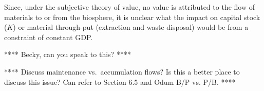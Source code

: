 Since,
under the subjective theory of value,
no value is attributed to the flow of materials
to or from the biosphere,
it is unclear what the impact on capital stock ($K$)
or material through-put
(extraction and waste disposal)
would be from a constraint of constant GDP.

**** Becky, can you speak to this? ****

**** Discuss maintenance vs.\ accumulation flows? 
Is this a better place to discuss this issue? Can refer to
Section 6.5 and Odum B/P vs. P/B. ****

%








%
%

